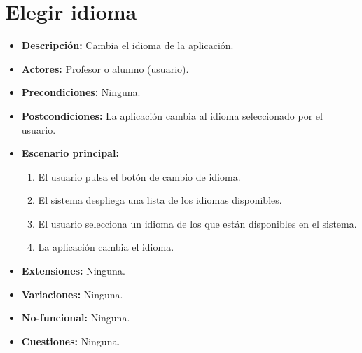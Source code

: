 \documentclass[12pt,letterpaper]{article}
\begin{document}
\section{Elegir idioma}
\begin{itemize}
	\item \textbf{Descripción:} Cambia el idioma de la aplicación.
	\item \textbf{Actores:} Profesor o alumno (usuario).
	\item \textbf{Precondiciones:} Ninguna. %
	\item \textbf{Postcondiciones:} La aplicación cambia al idioma seleccionado por el usuario.
	\item \textbf{Escenario principal:}
	\begin{enumerate}
		\item El usuario pulsa el botón de cambio de idioma.
		\item El sistema despliega una lista de los idiomas disponibles.
		\item El usuario  selecciona un idioma de los que están disponibles en el sistema.
		\item La aplicación cambia el idioma.
	\end{enumerate}
	\item \textbf{Extensiones:} Ninguna.
	\item \textbf{Variaciones:} Ninguna.
	\item \textbf{No-funcional:} Ninguna.
	\item \textbf{Cuestiones:} Ninguna.
\end{itemize}
\end{document}
